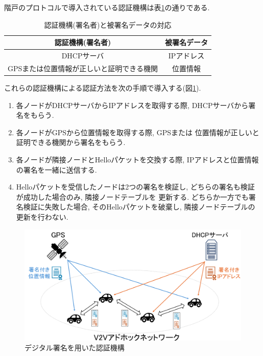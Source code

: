 \indent 階戸のプロトコルで導入されている認証機構は表\ref{tab:auth}の通りである.
\setlength{\tabcolsep}{30pt}
\begin{longtable}{cc}
  \caption{認証機構(署名者)と被署名データの対応}\label{tab:auth}\\
  \endfirsthead
  \hline
  \multicolumn{1}{c}{認証機構(署名者)} & \multicolumn{1}{c}{被署名データ} \\ \hline \hline
  DHCPサーバ & IPアドレス \\
  GPSまたは位置情報が正しいと証明できる機関 & 位置情報 \\ \hline
\end{longtable}
\vspace{2em}
\indent これらの認証機構による認証方法を次の手順で導入する(図\ref{fig:introduce}).
\begin{enumerate}
  \item 各ノードがDHCPサーバからIPアドレスを取得する際, 
  DHCPサーバから署名をもらう.
  \item 各ノードがGPSから位置情報を取得する際, GPSまたは
  位置情報が正しいと証明できる機関から署名をもらう.
  \item 各ノードが隣接ノードとHelloパケットを交換する際, 
  IPアドレスと位置情報の署名を一緒に送信する. 
  \item Helloパケットを受信したノードは2つの署名を検証し, 
  どちらの署名も検証が成功した場合のみ, 隣接ノードテーブルを
  更新する. どちらか一方でも署名検証に失敗した場合, 
  そのHelloパケットを破棄し, 隣接ノードテーブルの更新を行わない.
\end{enumerate}

\begin{figure}[h]
  \centering
  \includegraphics[scale=0.8]{figures/introduce.png}
  \caption{デジタル署名を用いた認証機構\cite{shinato}}
  \label{fig:introduce}
\end{figure}
